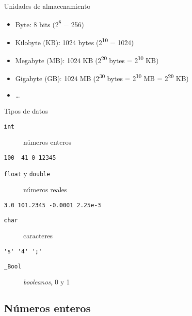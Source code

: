 \documentclass[xcolor={usenames,svgnames,dvipsnames}, aspectratio=169]{beamer}
\begin{document}
\begin{frame}[label={sec:org40cde47}]{Unidades de almacenamiento}
\begin{itemize}
\item Byte: 8 bits (2\textsuperscript{8} = 256)

\item Kilobyte (KB): 1024 bytes (2\textsuperscript{10} = 1024)

\item Megabyte (MB): 1024 KB (2\textsuperscript{20} bytes = 2\textsuperscript{10} KB)

\item Gigabyte (GB): 1024 MB (2\textsuperscript{30} bytes = 2\textsuperscript{10} MB = 2\textsuperscript{20} KB)

\item \ldots{}
\end{itemize}
\end{frame}



\begin{frame}[label={sec:org4ba0bc2},fragile]{Tipos de datos}
 \begin{description}
\item[{\texttt{int}}] números enteros
\end{description}
\begin{verbatim}
100 -41 0 12345
\end{verbatim}

\begin{description}
\item[{\texttt{float} y \texttt{double}}] números reales
\end{description}
\begin{verbatim}
3.0 101.2345 -0.0001 2.25e-3
\end{verbatim}
\begin{description}
\item[{\texttt{char}}] caracteres
\end{description}
\begin{verbatim}
's' '4' ';'
\end{verbatim}
\begin{description}
\item[{\texttt{\_Bool}}] \emph{booleanos}, 0 y 1
\end{description}
\end{frame}

\subsection{Números enteros}
\label{sec:org2f2efb6}
\end{document}
